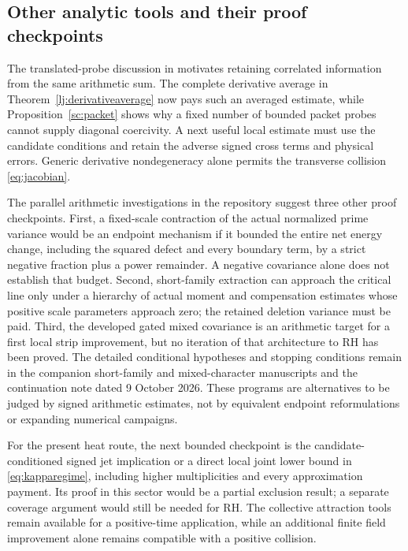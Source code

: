 \documentclass[11pt]{article}
\numberwithin{equation}{section}
\theoremstyle{definition}
\theoremstyle{remark}
\begin{document}
\subsection{Other analytic tools and their proof checkpoints}
The translated-probe discussion in \cite[Section~8]{planat} motivates
retaining correlated information from the same arithmetic sum.
The complete derivative average in Theorem~\ref{lj:derivativeaverage}
now pays such an averaged estimate, while Proposition~\ref{sc:packet}
shows why a fixed number of bounded packet probes cannot supply diagonal
coercivity. A next useful local estimate must use the candidate conditions
and retain the adverse signed cross terms and physical errors.
Generic derivative nondegeneracy alone permits the transverse collision
\eqref{eq:jacobian}.

The parallel arithmetic investigations in the repository suggest
three other proof checkpoints. First, a fixed-scale contraction of
the actual normalized prime variance would be an endpoint
mechanism if it bounded the entire net energy change, including
the squared defect and every boundary term, by a strict negative
fraction plus a power remainder. A negative covariance alone does
not establish that budget. Second, short-family extraction can
approach the critical line only under a hierarchy of actual
moment and compensation estimates whose positive scale parameters
approach zero; the retained deletion variance must be paid.
Third, the developed gated mixed covariance is an arithmetic
target for a first local strip improvement, but no iteration of
that architecture to RH has been proved. The detailed conditional
hypotheses and stopping conditions remain in the companion
short-family and mixed-character manuscripts and the continuation
note dated 9 October 2026. These programs are alternatives to be
judged by signed arithmetic estimates, not by equivalent endpoint
reformulations or expanding numerical campaigns.

For the present heat route, the next bounded checkpoint is the
candidate-conditioned signed jet implication or a direct local joint
lower bound in \eqref{eq:kapparegime}, including higher multiplicities
and every approximation payment. Its proof in this sector would be a
partial exclusion result; a separate coverage argument would still be
needed for RH. The collective attraction tools remain available for a
positive-time application, while an additional finite field improvement
alone remains compatible with a positive collision.

\appendix
\end{document}
